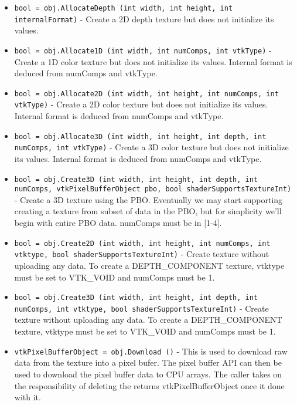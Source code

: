 \begin{itemize}
\item  \verb|bool = obj.AllocateDepth (int width, int height, int internalFormat)| -  Create a 2D depth texture but does not initialize its values.

\item  \verb|bool = obj.Allocate1D (int width, int numComps, int vtkType)| -  Create a 1D color texture but does not initialize its values.
 Internal format is deduced from numComps and vtkType.

\item  \verb|bool = obj.Allocate2D (int width, int height, int numComps, int vtkType)| -  Create a 2D color texture but does not initialize its values.
 Internal format is deduced from numComps and vtkType.

\item  \verb|bool = obj.Allocate3D (int width, int height, int depth, int numComps, int vtkType)| -  Create a 3D color texture but does not initialize its values.
 Internal format is deduced from numComps and vtkType.

\item  \verb|bool = obj.Create3D (int width, int height, int depth, int numComps, vtkPixelBufferObject pbo, bool shaderSupportsTextureInt)| -  Create a 3D texture using the PBO.
 Eventually we may start supporting creating a texture from subset of data
 in the PBO, but for simplicity we'll begin with entire PBO data.
 numComps must be in [1-4].

\item  \verb|bool = obj.Create2D (int width, int height, int numComps, int vtktype, bool shaderSupportsTextureInt)| -  Create texture without uploading any data.
 To create a DEPTH\_COMPONENT texture, vtktype must be set to VTK\_VOID and
 numComps must be 1.

\item  \verb|bool = obj.Create3D (int width, int height, int depth, int numComps, int vtktype, bool shaderSupportsTextureInt)| -  Create texture without uploading any data.
 To create a DEPTH\_COMPONENT texture, vtktype must be set to VTK\_VOID and
 numComps must be 1.

\item  \verb|vtkPixelBufferObject = obj.Download ()| -  This is used to download raw data from the texture into a pixel bufer. The
 pixel buffer API can then be used to download the pixel buffer data to CPU
 arrays. The caller takes on the responsibility of deleting the returns
 vtkPixelBufferObject once it done with it.


\end{itemize}

